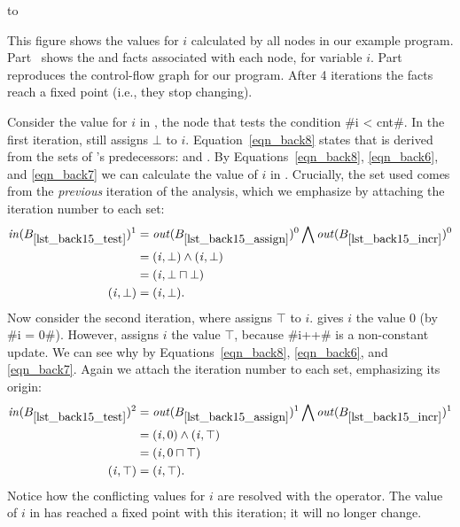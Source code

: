\documentclass[12pt]{report}
\begin{document}
\begin{myfig}[tb]
  \setlength{\tabcolsep}{2pt}
  \hbox to 
  \caption{This figure shows the values for $i$ calculated by all nodes in our
    example program. Part~ shows the \inE and
    \out facts associated with each node, for variable $i$. Part~
    reproduces the control-flow graph for our program. After 4
    iterations the facts reach a fixed point (i.e., they stop
    changing).}
  \label{fig_back13}
\end{myfig}

Consider the value for $i$ in , the node that
tests the condition #i < cnt#. In the first iteration,
 still assigns $\bot$ to
$i$. Equation~\eqref{eqn_back8} states that  is
derived from the \out sets of 's
predecessors:  and
. By Equations~\eqref{eqn_back8},
\eqref{eqn_back6}, and \eqref{eqn_back7} we can calculate the value of
$i$ in . Crucially, the \out set used comes from
the \emph{previous} iteration of the analysis, which we emphasize by
attaching the iteration number to each set:
\begin{align*}
  \inB{lst_back15_test}^1 &= \outB{lst_back15_assign}^0 \bigwedge \outB{lst_back15_incr}^0 \\
  &= {\factC{i}{\bot}} \wedge {\factC{i}{\bot}} \\
  &= {\factC{i}{\bot \lub \bot}} \\
  {\factC{i}{\bot}} &= {\factC{i}{\bot}}.
\end{align*}
Now consider the second iteration, where  assigns
$\top$ to $i$.  gives $i$ the value
0 (by #i = 0#). However,  assigns $i$ the value $\top$,
because #i++# is a non-constant update. We can see why by
Equations~\eqref{eqn_back8}, \eqref{eqn_back6}, and
\eqref{eqn_back7}. Again we attach the iteration number to each set,
emphasizing its origin:
\begin{align*}
  \inB{lst_back15_test}^2 &= \outB{lst_back15_assign}^1 \bigwedge \outB{lst_back15_incr}^1 \\
  &= {\factC{i}{0}} \wedge {\factC{i}{\top}} \\
  &= {\factC{i}{0 \lub \top}} \\
  {\factC{i}{\top}} &= {\factC{i}{\top}}.
\end{align*}
Notice how the conflicting values for $i$ are resolved with the \lub
operator. The value of $i$ in  has reached a fixed point
with this iteration; it will no longer change.
\end{document}
